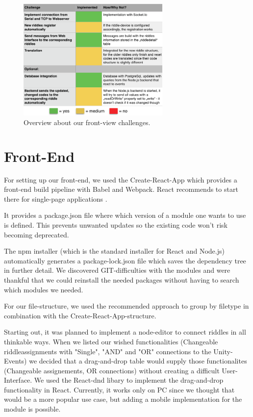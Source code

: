 \begin{figure}[th]
	\centering
	\includegraphics[width=75mm,scale=0.75]{Figures/backendOverview}
	\decoRule
	\caption[FrontViewTable]{Overview about our front-view challenges.}
	\label{fig:FrontViewTable}
\end{figure}

\section{Front-End}
For setting up our front-end, we used the Create-React-App which provides a front-end build pipeline with Babel and Webpack.
React recommends to start there for single-page applications \parencite{createReactApp}. 

It provides a package.json file where  which version of a module one wants to use is defined. 
This prevents unwanted updates so the existing code won't risk becoming deprecated.

The npm installer (which is the standard installer for React and Node.js) automatically generates a package-lock.json file which saves the dependency tree in further detail.
We discovered GIT-difficulties with the modules and were thankful that we could reinstall the needed packages without having to search which modules we needed.

For our file-structure, we used the recommended approach to group by filetype \parencite{reactStructure} in combination with the Create-React-App-structure.

Starting out, it was planned to implement a node-editor to connect riddles in all thinkable ways. 
When we listed our wished functionalities (Changeable riddleassignments with "Single", "AND" and "OR" connections to the Unity-Events) we decided that a drag-and-drop table would supply those functionalites (Changeable assignements, OR connections) without creating a difficult User-Interface.
We used the React-dnd libary \parencite{reactDND} to implement the drag-and-drop functionality in React. Currently, it works only on PC since we thought that would be a more popular use case, but adding a mobile implementation for the module is possible.

